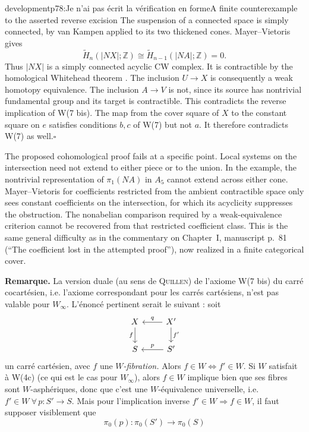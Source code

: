 \begin{dcomment}{development}{p78:Je n'ai pas écrit la vérification en forme}{A finite counterexample to the asserted reverse excision}
The suspension of a connected space is simply connected, by van Kampen applied to its two thickened cones. Mayer--Vietoris gives
\[
 \widetilde H_n(|NX|;\mathbb Z)
       \cong\widetilde H_{n-1}(|NA|;\mathbb Z)=0.
\]
Thus $|NX|$ is a simply connected acyclic CW complex. It is contractible by the homological Whitehead theorem \citep[Corollary~4.33]{Hatcher2002}. The inclusion $U\to X$ is consequently a weak homotopy equivalence. The inclusion $A\to V$ is not, since its source has nontrivial fundamental group and its target is contractible. This contradicts the reverse implication of W(7 bis). The map from the cover square of $X$ to the constant square on $e$ satisfies conditions $b,c$ of W(7) but not $a$. It therefore contradicts W(7) as well.\hfill$\square$

The proposed cohomological proof fails at a specific point. Local systems on the intersection need not extend to either piece or to the union. In the example, the nontrivial representation of $\pi_1(NA)$ in $A_5$ cannot extend across either cone. Mayer--Vietoris for coefficients restricted from the ambient contractible space only sees constant coefficients on the intersection, for which its acyclicity suppresses the obstruction. The nonabelian comparison required by a weak-equivalence criterion cannot be recovered from that restricted coefficient class. This is the same general difficulty as in the commentary on Chapter~I, manuscript p.~81 (``The coefficient lost in the attempted proof''), now realized in a finite categorical cover.
\end{dcomment}


\textbf{Remarque.} La version duale (au sens de \textsc{Quillen}) de l'axiome W(7 bis) du carré cocartésien, i.e. l'axiome correspondant pour les carrés cartésiens, n'est pas valable pour $W_\infty$. L'énoncé pertinent serait le suivant : soit
\[
\begin{tikzcd}
X & X' \arrow[l, "q"'] \arrow[d, "f'"] \\
S & S' \arrow[l, "p"']
\arrow[from=1-1, to=2-1, "f"']
\end{tikzcd}
\]
un carré cartésien, avec $f$ une \textit{$W$-fibration.} Alors $f\in W\Longleftrightarrow f'\in W$. Si $W$ satisfait à W(4c) (ce qui est le cas pour $W_\infty$), alors $f\in W$ implique bien que ses fibres sont $W$-asphériques, donc que c'est une $W$-équivalence universelle, i.e. $f'\in W\ \forall\, p:S'\longrightarrow S$. Mais pour l'implication inverse $f'\in W\Longrightarrow f\in W$, il faut supposer visiblement que
\[
\pi_0(p):\pi_0(S')\longrightarrow\pi_0(S)
\]

